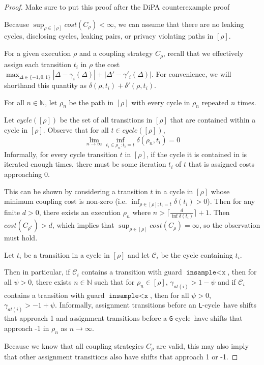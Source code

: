 \documentclass[12pt]{article}
\newcommand{\NN}{\mathbb{N}}
\newcommand{\lguard}[1][x]{\texttt{insample} < #1}
\newcommand{\gcycle}{\texttt{G}-cycle}
\newcommand{\lcycle}{\texttt{L}-cycle}
\theoremstyle{definition}
\begin{document}
\begin{proof}{\color{red} Make sure to put this proof after the DiPA counterexample proof}

    Because $\sup_{\rho\in [\rho]}cost(C_\rho)< \infty$, we can assume that there are no leaking cycles, disclosing cycles, leaking pairs, or privacy violating paths in $[\rho]$.


    For a given execution $\rho$ and a coupling strategy $C_\rho$, recall that we effectively assign each transition $t_i$ in $\rho$ the cost $\max_{\Delta \in \{-1, 0, 1\}}|\Delta - \gamma_i(\Delta)| + |\Delta' - \gamma'_i(\Delta)|$. For convenience, we will shorthand this quantity as $\delta(\rho, t_i) + \delta'(\rho, t_i)$.


    For all $n\in \NN$, let $\rho_n$ be the path in $[\rho]$ with every cycle in $\rho_n$ repeated $n$ times. 

   Let $cycle([\rho])$ be the set of all transitions in $[\rho]$ that are contained within a cycle in $[\rho]$. Observe that for all $t\in cycle([\rho])$, \[
        \lim_{n\to\infty}\inf_{t_i\in\rho_n: t_i=t} \delta(\rho_n, t_i) = 0
    \]
    Informally, for every cycle transition $t$ in $[\rho]$, if the cycle it is contained in is iterated enough times, there must be some iteration $t_i$ of $t$ that is assigned costs approaching 0. 

    This can be shown by considering a transition $t$ in a cycle in $[\rho]$ whose minimum coupling cost is non-zero (i.e. $\inf_{\rho\in[\rho]; t_i=t} \delta(t_i) > 0$). Then for any finite $d>0$, there exists an execution $\rho_n$ where $n>\lceil\frac{d}{\inf\delta(t_i)}\rceil+1$. Then $cost(C_{\rho^*})>d$, which implies that $\sup_{\rho\in [\rho]}cost(C_\rho) = \infty$, so the observation must hold. 

    Let $t_i$ be a transition in a cycle in $[\rho]$ and let $\mathcal{C}_i$ be the cycle containing $t_i$. 

    Then in particular, if $\mathcal{C}_i$ contains a transition with guard $\lguard[\texttt{x}]$, then for all $\psi>0$, there exists $n\in \NN$ such that for $\rho_n\in [\rho]$, $\gamma_{at(i)}> 1-\psi$ and if $\mathcal{C}_i$ contains a transition with guard $\lguard[\texttt{x}]$, then for all $\psi>0$, $\gamma_{at(i)}> -1+\psi$. 
    Informally, assignment transitions before an \lcycle\ have shifts that approach 1 and assignment transitions before a \gcycle\ have shifts that approach -1 in $\rho_n$ as $n\to\infty$. 

    Because we know that all coupling strategies $C_{\rho}$ are valid, this may also imply that other assignment transitions also have shifts that approach 1 or -1. 


\end{proof}
\end{document}
